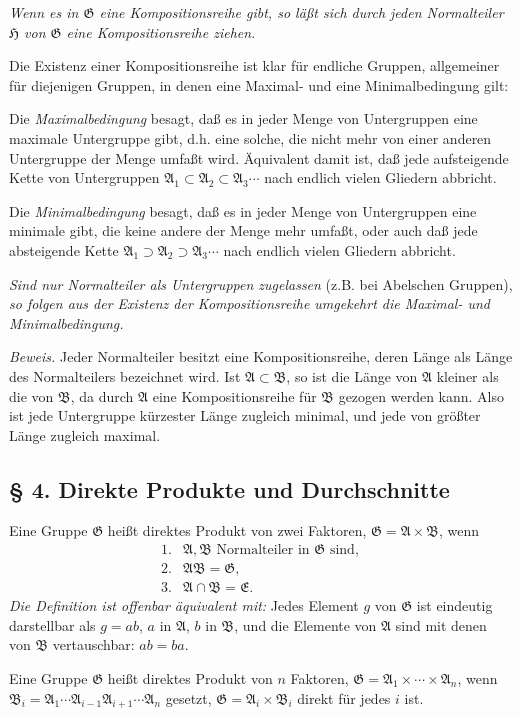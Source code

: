 \documentclass[11pt]{article}
\providecommand{\mG}{\mathfrak{G}}
\providecommand{\mA}{\mathfrak{A}}
\providecommand{\mB}{\mathfrak{B}}
\providecommand{\mE}{\mathfrak{E}}
\providecommand{\mH}{\mathfrak{H}}
\begin{document}
\emph{Wenn es in $\mG$ eine Kompositionsreihe gibt, so läßt sich durch jeden Normalteiler $\mH$ von $\mG$ eine Kompositionsreihe ziehen.}

Die Existenz einer Kompositionsreihe ist klar für endliche Gruppen, allgemeiner für diejenigen Gruppen, in denen eine Maximal- und eine Minimalbedingung gilt:

Die \emph{Maximalbedingung} besagt, daß es in jeder Menge von Untergruppen eine maximale Untergruppe gibt, d.h. eine solche, die nicht mehr von einer anderen Untergruppe der Menge umfaßt wird. Äquivalent damit ist, daß jede aufsteigende Kette von Untergruppen $\mA_1\subset\mA_2\subset\mA_3\cdots$ nach endlich vielen Gliedern abbricht.

Die \emph{Minimalbedingung} besagt, daß es in jeder Menge von Untergruppen eine minimale gibt, die keine andere der Menge mehr umfaßt, oder auch daß jede absteigende Kette $\mA_1\supset\mA_2\supset\mA_3\cdots$ nach endlich vielen Gliedern abbricht.

\emph{Sind nur Normalteiler als Untergruppen zugelassen} (z.B. bei Abelschen Gruppen), \emph{so folgen aus der Existenz der Kompositionsreihe umgekehrt die Maximal- und Minimalbedingung.}

\emph{Beweis.} Jeder Normalteiler besitzt eine Kompositionsreihe, deren Länge als Länge des Normalteilers bezeichnet wird. Ist $\mA\subset\mB$, so ist die Länge von $\mA$ kleiner als die von $\mB$, da durch $\mA$ eine Kompositionsreihe für $\mB$ gezogen werden kann. Also ist jede Untergruppe kürzester Länge zugleich minimal, und jede von größter Länge zugleich maximal.

\subsection*{§ 4. Direkte Produkte und Durchschnitte}

Eine Gruppe $\mG$ heißt direktes Produkt von zwei Faktoren, $\mG=\mA\times\mB$, wenn
\[
\begin{array}{ll}
1.& \mA,\mB\text{ Normalteiler in }\mG\text{ sind},\\
2.& \mA\mB=\mG,\\
3.& \mA\cap\mB=\mE.
\end{array}
\]
\emph{Die Definition ist offenbar äquivalent mit:} Jedes Element $g$ von $\mG$ ist eindeutig darstellbar als $g=ab$, $a$ in $\mA$, $b$ in $\mB$, und die Elemente von $\mA$ sind mit denen von $\mB$ vertauschbar: $ab=ba$.

Eine Gruppe $\mG$ heißt direktes Produkt von $n$ Faktoren, $\mG=\mA_1\times\cdots\times\mA_n$, wenn $\mB_i=\mA_1\cdots\mA_{i-1}\mA_{i+1}\cdots\mA_n$ gesetzt, $\mG=\mA_i\times\mB_i$ direkt für jedes $i$ ist.
\end{document}
